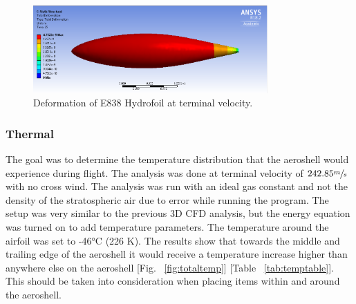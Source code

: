 \begin{figure}[H]
	\centering
    \includegraphics[width=0.8\textwidth]{Aeroshell/deform.PNG}
    \caption{\label{fig:deformation}Deformation of E838 Hydrofoil at terminal velocity.}
\end{figure}

\subsubsection*{Thermal}
\indent\indent The goal was to determine the temperature distribution that the aeroshell would experience during flight. The analysis was done at terminal velocity of $242.85 \sfrac{m}{s}$ with no cross wind. The analysis was run with an ideal gas constant and not the density of the stratospheric air due to error while running the program. The setup was very similar to the previous 3D CFD analysis, but the energy equation was turned on to add temperature parameters. The temperature around the airfoil was set to -46°C (226 K). The results show that towards the middle and trailing edge of the aeroshell it would receive a temperature increase higher than anywhere else on the aeroshell [Fig. ~\ref{fig:totaltemp}] [Table ~\ref{tab:temptable}]. This should be taken into consideration when placing items within and around the aeroshell.

